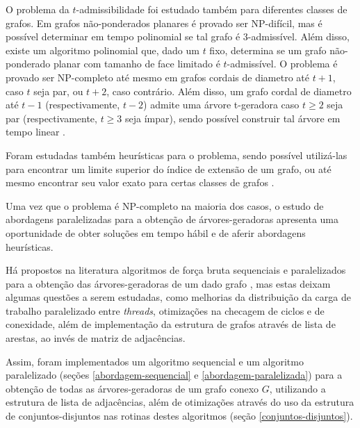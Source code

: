 \documentclass[article,a4paper,12pt,brazil,sumario=tradicional]{abntex2}
\theoremstyle{definition} %
\begin{document}
O problema da $t$-admissibilidade foi estudado também para diferentes classes de grafos. Em grafos não-ponderados planares é provado ser NP-difícil, mas é possível determinar em tempo polinomial se tal grafo é $3$-admissível\cite{cunha_marciano_moraes_santiago_santos}. Além disso, existe um algoritmo polinomial que, dado um $t$ fixo, determina se um grafo não-ponderado planar com tamanho de face limitado é $t$-admissível\cite{FEKETE200185}. O problema é provado ser NP-completo até mesmo em grafos cordais de diametro até $t + 1$, caso $t$ seja par, ou $t + 2$, caso contrário. Além disso, um grafo cordal de diametro até $t - 1$ (respectivamente, $t - 2$) admite uma árvore t-geradora caso $t\geq2$ seja par (respectivamente, $t\geq3$ seja ímpar), sendo possível construir tal árvore em tempo linear \cite{BRANDSTADT2004329}.

Foram estudadas também heurísticas para o problema, sendo possível utilizá-las para encontrar um limite superior do índice de extensão de um grafo, ou até mesmo encontrar seu valor exato para certas classes de grafos \cite{COUTO2022106265} \cite{cunha_marciano_moraes_santiago_santos}.


Uma vez que o problema é NP-completo na maioria dos casos, o estudo de abordagens paralelizadas para a obtenção de árvores-geradoras apresenta uma oportunidade de obter soluções em tempo hábil e de aferir abordagens heurísticas.

Há propostos na literatura algoritmos de força bruta sequenciais e paralelizados para a obtenção das árvores-geradoras de um dado grafo \cite{COUTO2022106265} \cite{cunha_marciano_moraes_santiago_santos}, mas estas deixam algumas questões a serem estudadas, como melhorias da distribuição da carga de trabalho paralelizado entre \textit{threads}, otimizações na checagem de ciclos e de conexidade, além de implementação da estrutura de grafos através de lista de arestas, ao invés de matriz de adjacências.

Assim, foram implementados um algoritmo sequencial e um algoritmo paralelizado (seções \ref{abordagem-sequencial} e \ref{abordagem-paralelizada}) para a obtenção de todas as árvores-geradoras de um grafo conexo $G$, utilizando a estrutura de lista de adjacências, além de otimizações através do uso da estrutura de conjuntos-disjuntos nas rotinas destes algoritmos (seção \ref{conjuntos-disjuntos}).
\end{document}

